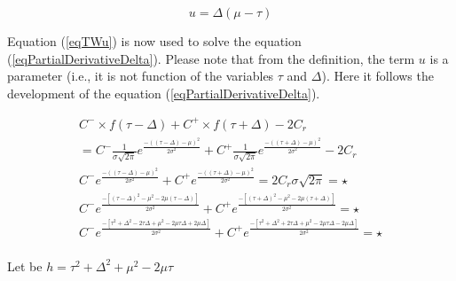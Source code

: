 \begin{equation}
    u=\Delta(\mu-\tau)
    \label{eqTWu}
\end{equation}

Equation (\ref{eqTWu}) is now used to solve the equation (\ref{eqPartialDerivativeDelta}). Please note that from the definition, the term $u$ is a parameter (i.e., it is not function of the variables $\tau$ and $\Delta$). Here it follows the development of the equation (\ref{eqPartialDerivativeDelta}).

\begin{equation}
    \begin{split}
        C^-\times f(\tau-\Delta)+C^+ \times f(\tau+\Delta)-2C_r \\= C^{-}\frac{1}{\sigma\sqrt{2\pi}}e^{\frac{-((\tau-\Delta)-\mu)^2}{2\sigma^2}} + C^{+}\frac{1}{\sigma\sqrt{2\pi}}e^{\frac{-((\tau+\Delta)-\mu)^2}{2\sigma^2}} - 2C_r\\
        C^{-}e^{\frac{-((\tau-\Delta)-\mu)^2}{2\sigma^2}} + C^{+}e^{\frac{-((\tau+\Delta)-\mu)^2}{2\sigma^2}} = 2C_r\sigma\sqrt{2\pi} = \star \\
        C^{-}e^{\frac{-[(\tau-\Delta)^2-\mu^2 -2\mu(\tau-\Delta)]}{2\sigma^2}} + C^{+}e^{\frac{-[(\tau+\Delta)^2-\mu^2 -2\mu(\tau+\Delta)]}{2\sigma^2}} = \star\\
        C^{-}e^{\frac{-[\tau^2+\Delta^2-2\tau\Delta +\mu^2 -2\mu\tau\Delta + 2\mu\Delta]}{2\sigma^2}} + C^{+}e^{\frac{-[\tau^2+\Delta^2+2\tau\Delta +\mu^2 -2\mu\tau\Delta - 2\mu\Delta]}{2\sigma^2}} = \star\\
    \end{split}
\end{equation}

Let be $h=\tau^2+\Delta^2+\mu^2-2\mu\tau$

